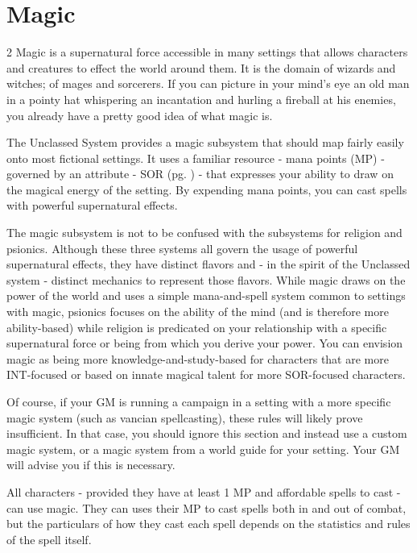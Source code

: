 \chapter{Magic}\label{magic}

\begin{multicols*}{2}
    Magic is a supernatural force accessible in many settings that
    allows characters and creatures to effect the world around them.
    It is the domain of wizards and witches; of mages and sorcerers. If
    you can picture in your mind's eye an old man in a pointy hat
    whispering an incantation and hurling a fireball at his enemies,
    you already have a pretty good idea of what magic is.

    The Unclassed System provides a magic subsystem that should map
    fairly easily onto most fictional settings. It uses a familiar
    resource - mana points (MP) - governed by an
    attribute - SOR (pg. \label{sorcery}) -
    that expresses your ability to draw on the magical energy of the
    setting. By expending mana points, you can cast spells with
    powerful supernatural effects.

    The magic subsystem is not to be confused with the subsystems for
    religion and psionics. Although these three systems all govern the
    usage of powerful supernatural effects, they have distinct flavors
    and - in the spirit of the Unclassed system - distinct mechanics
    to represent those flavors. While magic draws on the power of
    the world and uses a simple mana-and-spell system common to
    settings with magic, psionics focuses on the ability of the mind
    (and is therefore more ability-based) while religion is predicated
    on your relationship with a specific supernatural force or being
    from which you derive your power. You can envision magic as being
    more knowledge-and-study-based for characters that are more
    INT-focused or based on innate magical talent
    for more SOR-focused characters.

    Of course, if your GM is running a campaign in a setting with a
    more specific magic system (such as vancian spellcasting), these
    rules will likely prove insufficient. In that case, you should
    ignore this section and instead use a custom magic system, or a
    magic system from a world guide for your setting. Your GM will
    advise you if this is necessary.

    All characters - provided they have at least 1 MP and affordable
    spells to cast - can use magic. They can uses their MP to cast
    spells both in and out of combat, but the particulars of how
    they cast each spell depends on the statistics and rules of the
    spell itself.
    

\end{multicols*}
